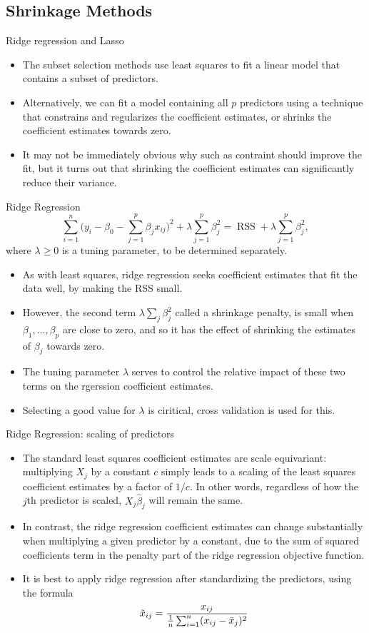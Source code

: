 \documentclass[11pt, a4paper]{article}
\begin{document}
\subsection{Shrinkage Methods}
Ridge regression and Lasso
\begin{itemize}
\item The subset selection methods use least squares to fit a linear model that contains a subset of predictors.
\item Alternatively, we can fit a model containing all $p$ predictors using a technique that constrains and regularizes the coefficient estimates, or shrinks the coefficient estimates towards zero.
\item It may not be immediately obvious why such as contraint should improve the fit, but it turns out that shrinking the coefficient estimates can significantly reduce their variance.
\end{itemize}
Ridge Regression
\[
  \sum_{i=1}^n\bigg(y_i-\beta_0-\sum_{j=1}^p\beta_j x_{ij}\bigg)^2+\lambda\sum_{j=1}^p\beta_j^2=\operatorname{RSS}+\lambda\sum_{j=1}^p\beta_j^2,
\]
where $\lambda\geq 0$ is a tuning parameter, to be determined separately.\\[1mm]
\begin{itemize}
\item As with least squares, ridge regression seeks coefficient estimates that fit the data well, by making the RSS small.
\item However, the second term $\lambda\sum_j\beta_j^2$ called a shrinkage penalty, is small when $\beta_1,\dots,\beta_p$ are close to zero, and so it has the effect of shrinking the estimates of $\beta_j$ towards zero.
\item The tuning parameter $\lambda$ serves to control the relative impact of these two terms on the rgerssion coefficient estimates.
\item Selecting a good value for $\lambda$ is ciritical, cross validation is used for this.
  \end{itemize}
  Ridge Regression: scaling of predictors
\begin{itemize}
  \item The standard least squares coefficient estimates are scale equivariant: multiplying $X_j$ by a constant $c$ simply leads to a scaling of the least squares coefficient estimates by a factor of $1/c$. In other words, regardless of how the $j$th predictor is scaled, $X_j\hat{\beta}_j$ will remain the same.
  \item In contrast, the ridge regression coefficient estimates can change substantially when multiplying a given predictor by a constant, due to the sum of squared coefficients term in the penalty part of the ridge regression objective function.
  \item It is best to apply ridge regression after standardizing the predictors, using the formula
\[
\tilde{x}_{ij}=\frac{x_{ij}}{{1\over n}\sum_{i=1}^n(x_{ij}-\bar{x}_j)^2}
\]
\end{itemize}
\end{document}

